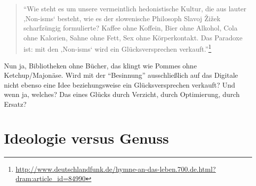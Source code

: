\documentclass[a4paper,
fontsize=11pt,
oneside,
numbers=noperiodatend,
parskip=half-,
bibliography=totoc,
final
]{scrartcl}
\begin{document}
\begin{quote}
\enquote{Wie steht es um unsere vermeintlich hedonistische Kultur, die
aus lauter ‚Non-isms` besteht, wie es der slowenische Philosoph Slavoj
Žižek scharfzüngig formulierte? Kaffee ohne Koffein, Bier ohne Alkohol,
Cola ohne Kalorien, Sahne ohne Fett, Sex ohne Körperkontakt. Das
Paradoxe ist: mit den ‚Non-isms` wird ein Glücksversprechen
verkauft.}\footnote{\url{http://www.deutschlandfunk.de/hymne-an-das-leben.700.de.html?dram:article\_id=84990}}
\end{quote}

Nun ja, Bibliotheken ohne Bücher, das klingt wie Pommes ohne
Ketchup/Majonäse. Wird mit der \enquote{Besinnung} ausschließlich auf
das Digitale nicht ebenso eine Idee beziehungsweise ein
Glücksversprechen verkauft? Und wenn ja, welches? Das eines Glücks durch
Verzicht, durch Optimierung, durch Ersatz?

\section{Ideologie versus Genuss}\label{ideologie-versus-genuss}
\end{document}
